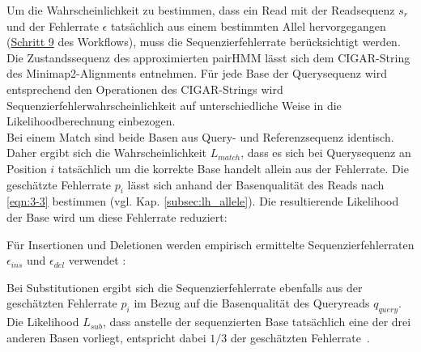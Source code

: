 Um die Wahrscheinlichkeit zu bestimmen, dass ein Read mit der Readsequenz $s_{r}$ und der Fehlerrate $\epsilon$ tatsächlich aus einem bestimmten Allel hervorgegangen (\hyperref[step9]{Schritt 9\label{step9txt}} des Workflows), muss die Sequenzierfehlerrate berücksichtigt werden. Die Zustandssequenz des approximierten pairHMM lässt sich dem CIGAR-String des Minimap2-Alignments entnehmen. Für jede Base der Querysequenz wird entsprechend den Operationen des CIGAR-Strings wird Sequenzierfehlerwahrscheinlichkeit auf unterschiedliche Weise in die Likelihoodberechnung einbezogen. \\

Bei einem Match sind beide Basen aus Query- und Referenzsequenz identisch. Daher ergibt sich die Wahrscheinlichkeit $L_{match}$, dass es sich bei Querysequenz an Position $i$ tatsächlich um die korrekte Base handelt allein aus der Fehlerrate. Die geschätzte Fehlerrate $ p_{i} $ lässt sich anhand der Basenqualität des Reads nach \eqref{eqn:3-3} bestimmen (vgl. Kap. \ref{subsec:lh_allele}). Die resultierende Likelihood der Base wird um diese Fehlerrate reduziert:
\vspace{-0.5cm}
\begin{center}
\end{center}
Für Insertionen und Deletionen werden empirisch ermittelte Sequenzierfehlerraten $\epsilon_{ins}$ und $\epsilon_{del}$ verwendet \cite{schirmer_2016}: 
\vspace{-0.5cm}
\begin{center}
\end{center}

Bei Substitutionen ergibt sich die Sequenzierfehlerrate ebenfalls aus der geschätzten Fehlerrate $p_{i}$ im Bezug auf die Basenqualität des Queryreads $q_{query}$. Die Likelihood $L_{sub}$, dass anstelle der sequenzierten Base tatsächlich eine der drei anderen Basen vorliegt, entspricht dabei $ 1/3 $ der geschätzten Fehlerrate~\cite{kuhner_2014}.
\vspace{-0.5cm}
\begin{center}
\end{center}

